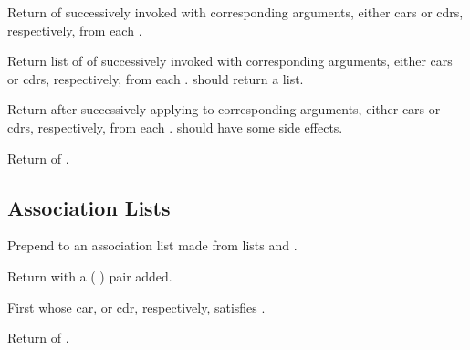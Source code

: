 \begin{LIST}{1cm}
  {
  Return  of  successively
  invoked with corresponding arguments, either cars or cdrs, respectively,
  from each . 
  }

  {
  Return list of 
   of
   successively invoked with corresponding arguments,
  either cars or cdrs, respectively,
  from each .  should return a list.
  }

  {
  Return  after successively applying
   to corresponding arguments, either cars or cdrs,
  respectively, from each .  should have some side
  effects. 
  }

  {
  Return  of .
  }

\end{LIST}


\subsection{Association Lists} 
\label{section:Association Lists}
\begin{LIST}{1cm}

  {
    Prepend to  an association list made from lists  and .
  }

  {
  Return  with a (  ) pair added.
  }

  {
%
  First  whose car, or cdr, respectively, satisfies .
  }

  {
  Return  of .
  }

\end{LIST}


